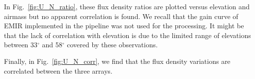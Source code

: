 In Fig.~\ref{fig:U_N_ratio}, these flux density ratios are plotted versus elevation and airmass but no apparent correlation is found.
We recall that the gain curve of EMIR implemented in the pipeline was not used for the processing. It might be
that the lack of correlation with elevation is due to
the limited range of elevations  between 33$^{\circ}$ and 58$^{\circ}$ covered by these observations.

Finally, in Fig.~\ref{fig:U_N_corr},  we find that the flux density variations are correlated between the three arrays.


